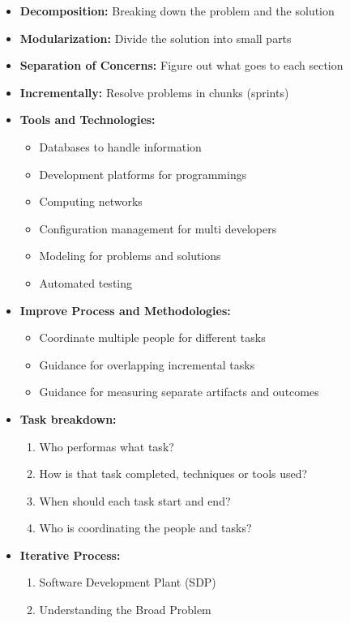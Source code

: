 \documentclass[12pt]{article}
\begin{document}
\begin{itemize}
		  \item \textbf{Decomposition:} Breaking down the problem and the solution
		  \item \textbf{Modularization:} Divide the solution into small parts
		  \item \textbf{Separation of Concerns:} Figure out what goes to each section
		  \item \textbf{Incrementally:} Resolve problems in chunks (sprints)
		  \item \textbf{Tools and Technologies:}
		  		\begin{itemize}
		  			\item Databases to handle information
		  			\item Development platforms for programmings
		  			\item Computing networks
		  			\item Configuration management for multi developers
		  			\item Modeling for problems and solutions
		  			\item Automated testing
		  		\end{itemize}
		  \item \textbf{Improve Process and Methodologies:}
		  		\begin{itemize}
					\item Coordinate multiple people for different tasks
					\item Guidance for overlapping incremental tasks
					\item Guidance for measuring separate artifacts and outcomes
		  		\end{itemize}
		  \item \textbf{Task breakdown:}
		  		\begin{enumerate}
					\item Who performas what task?
					\item How is that task completed, techniques or tools used?
					\item When should each task start and end?
					\item Who is coordinating the people and tasks?
		  		\end{enumerate}
		  \item \textbf{Iterative Process:}
		  		\begin{enumerate}
					\item Software Development Plant (SDP)
					\item Understanding the Broad Problem

\end{enumerate}
\end{itemize}
\end{document}
